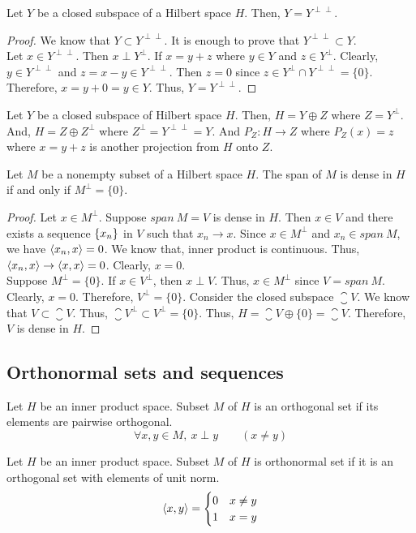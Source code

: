 \begin{lemma}
	Let $Y$ be a closed subspace of a Hilbert space $H$.
	Then, $Y = Y^{\perp\perp}$.
\end{lemma}
\begin{proof}
	We know that $Y \subset Y^{\perp\perp}$.
	It is enough to prove that $Y^{\perp\perp} \subset Y$.\\
	Let $x \in Y^{\perp\perp}$.
	Then $x \perp Y^\perp$.
	If $x = y+z$ where $y \in Y$ and $z \in Y^\perp$.
	Clearly, $y \in Y^{\perp\perp}$ and $z = x-y \in Y^{\perp\perp}$.
	Then $z = 0$ since $z \in Y^\perp \cap Y^{\perp\perp} = \{ 0 \}$.
	Therefore, $x = y + 0 = y \in Y$.
	Thus, $Y = Y^{\perp\perp}$.
\end{proof}

\begin{remark}
	Let $Y$ be a closed subspace of Hilbert space $H$.
	Then, $H = Y \oplus Z$ where $Z = Y^\perp$.
	And, $H = Z \oplus Z^\perp$ where $Z^\perp = Y^{\perp\perp} = Y$.
	And $P_Z : H \to Z$ where $P_Z(x) = z$ where $x = y+z$ is another projection from $H$ onto $Z$.
\end{remark}

\begin{lemma}[dense]
	Let $M$ be a nonempty subset of a Hilbert space $H$.
	The span of $M$ is dense in $H$ if and only if $M^\perp = \{ 0 \}$.
\end{lemma}
\begin{proof}
	Let $x \in M^\perp$.
	Suppose $span\ M = V$ is dense in $H$.
	Then $x \in V$ and there exists a sequence $\left\{x_n\right\}$ in $V$ such that $x_n \to x$.
	Since $x \in M^\perp$ and $x_n \in span\ M$, we have $\left\langle x_n,x \right\rangle = 0$.
	We know that, inner product is continuous.
	Thus, $\left\langle x_n,x \right\rangle \to \left\langle x,x \right\rangle = 0$.
	Clearly, $x = 0$.\\

	Suppose $M^\perp = \{ 0 \}$.
	If $x \in V^\perp$, then $x \perp V$.
	Thus, $x \in M^\perp$ since $V = span\ M$.
	Clearly, $x = 0$.
	Therefore, $V^\perp = \{ 0 \}$.
	Consider the closed subspace $\closure{V}$.
	We know that $V \subset \closure{V}$.
	Thus, $\closure{V}^\perp \subset V^\perp = \{ 0 \}$.
	Thus, $H = \closure{V} \oplus \{ 0 \} = \closure{V}$.
	Therefore, $V$ is dense in $H$.
\end{proof}

\subsection{Orthonormal sets and sequences}
\begin{definition}[orthogonal]
	Let $H$ be an inner product space.
	Subset $M$ of $H$ is an orthogonal set if its elements are pairwise orthogonal.
	\[ \forall x,y \in M,\ x \perp y \qquad (x \ne y) \]
\end{definition}
\begin{definition}[orthonormal]
	Let $H$ be an inner product space.
	Subset $M$ of $H$ is orthonormal set if it is an orthogonal set with elements of unit norm.
	\[ \left\langle x,y \right\rangle = \begin{cases} 0 & x \ne y \\ 1 & x = y \end{cases} \]
\end{definition}

